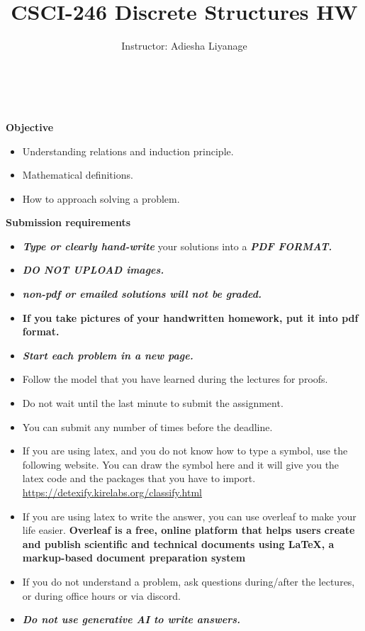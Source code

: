 \documentclass[12pt]{exam}
\title{CSCI-246 Discrete Structures HW \assignmentnumber}
\author{Instructor: Adiesha Liyanage}
\begin{document}
\maketitle

\hrulefill
\\
\\
\textbf{Objective}
\begin{itemize}
    \item Understanding relations and induction principle.
    \item Mathematical definitions.
    \item How to approach solving a problem.
\end{itemize}

\textbf{Submission requirements}
\begin{itemize}
    \item \textbf{\textit{Type or clearly hand-write}} your solutions into a \textbf{\textit{PDF FORMAT.}} 
    \item \textbf{\textit{DO NOT UPLOAD images.}}
    \item \textbf{\textit{non-pdf or emailed solutions will not be graded.}}
    \item \textbf{If you take pictures of your handwritten homework, put it into pdf format.}
    \item \textbf{\textit{Start each problem in a new page.}}
    \item Follow the model that you have learned during the lectures for proofs.
    \item Do not wait until the last minute to submit the assignment.
    \item You can submit any number of times before the deadline. 
    \item If you are using latex, and you do not know how to type a symbol, use the following website. You can draw the symbol here and it will give you the latex code and the packages that you have to import. \url{https://detexify.kirelabs.org/classify.html}
    \item If you are using latex to write the answer, you can use overleaf to make your life easier. \textbf{Overleaf is a free, online platform that helps users create and publish scientific and technical documents using LaTeX, a markup-based document preparation system}
    \item If you do not understand a problem, ask questions during/after the lectures, or during office hours or via discord.
    \item \textbf{\textit{Do not use generative AI to write answers.}} 
\end{itemize}
\end{document}
